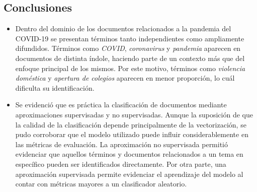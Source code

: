\subsection{Conclusiones}
\begin{itemize}
    \item Dentro del dominio de los documentos relacionados a la pandemia del COVID-19 se presentan términos tanto independientes como ampliamente difundidos. Términos como \textit{COVID}, \textit{coronavirus} y \textit{pandemia} aparecen en documentos de distinta índole, haciendo parte de un contexto más que del enfoque principal de los mismos. Por este motivo, términos como \textit{violencia doméstica} y \textit{apertura de colegios} aparecen en menor proporción, lo cuál dificulta su identificación.
    
    \item Se evidenció que es práctica la clasificación de documentos mediante aproximaciones supervisadas y no supervisadas. Aunque la suposición de que la calidad de la clasificación depende principalmente de la vectorización, se pudo corroborar que el modelo utilizado puede influir considerablemente en las métricas de evaluación. La aproximación no supervisada permitió evidenciar que aquellos términos y documentos relacionados a un tema en específico pueden ser identificados directamente. Por otra parte, una aproximación supervisada permite evidenciar el aprendizaje del modelo al contar con métricas mayores a un clasificador aleatorio. 
\end{itemize}
